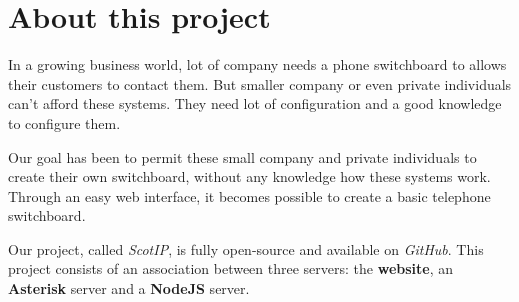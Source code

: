 \chapter{About this project}

In a growing business world, lot of company needs a phone switchboard to allows their customers to contact them.  But smaller company or even private individuals can't afford these systems. They need lot of configuration and a good knowledge to configure them. 


Our goal has been to permit these small company and private individuals to create their own switchboard, without any knowledge how these systems work. Through an easy web interface, it becomes possible to create a basic telephone switchboard.

Our project, called \textit{ScotIP}, is fully open-source and available on \textit{GitHub}. This project consists of an association between three servers: the \textbf{website}, an \textbf{Asterisk} server and a \textbf{NodeJS} server.


